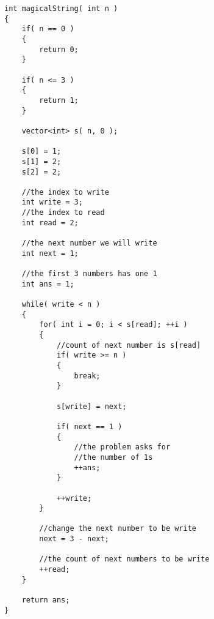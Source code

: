 \setcounter{lstlisting}{0}
\begin{lstlisting}[style=customc, caption={Read And Write Pointers}]
int magicalString( int n )
{
    if( n == 0 )
    {
        return 0;
    }

    if( n <= 3 )
    {
        return 1;
    }

    vector<int> s( n, 0 );

    s[0] = 1;
    s[1] = 2;
    s[2] = 2;

    //the index to write
    int write = 3;
    //the index to read
    int read = 2;

    //the next number we will write
    int next = 1;

    //the first 3 numbers has one 1
    int ans = 1;

    while( write < n )
    {
        for( int i = 0; i < s[read]; ++i )
        {
            //count of next number is s[read]
            if( write >= n )
            {
                break;
            }

            s[write] = next;

            if( next == 1 )
            {
                //the problem asks for
                //the number of 1s
                ++ans;
            }

            ++write;
        }

        //change the next number to be write
        next = 3 - next;

        //the count of next numbers to be write
        ++read;
    }

    return ans;
}

\end{lstlisting}